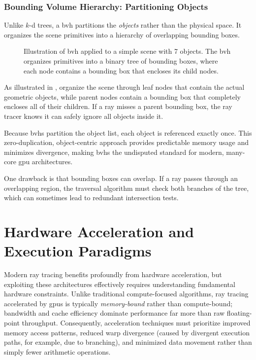 \subsubsection{Bounding Volume Hierarchy: Partitioning Objects}

Unlike $k$-d trees, a \gls{bvh} partitions the \emph{objects} rather than the physical space. It organizes the scene primitives into a hierarchy of overlapping bounding boxes.

\begin{figure}
  \caption{Illustration of \gls{bvh} applied to a simple scene with 7 objects. The \gls{bvh} organizes primitives into a binary tree of bounding boxes, where each node contains a bounding box that encloses its child nodes.}
\end{figure}

As illustrated in ,  organize the scene through leaf nodes that contain the actual geometric objects, while parent nodes contain a bounding box that completely encloses all of their children. If a ray misses a parent bounding box, the ray tracer knows it can safely ignore all objects inside it.

Because \glspl{bvh} partition the object list, each object is referenced exactly once. This zero-duplication, object-centric approach provides predictable memory usage and minimizes divergence, making \glspl{bvh} the undisputed standard for modern, many-core \gls{gpu} architectures.

One drawback is that bounding boxes can overlap. If a ray passes through an overlapping region, the traversal algorithm must check both branches of the tree, which can sometimes lead to redundant intersection tests.

\section{Hardware Acceleration and  Execution Paradigms}

Modern ray tracing benefits profoundly from hardware acceleration, but exploiting these architectures effectively requires understanding fundamental hardware constraints. Unlike traditional compute-focused algorithms, ray tracing accelerated by \glspl{gpu} is typically \emph{memory-bound} rather than compute-bound; bandwidth and cache efficiency dominate performance far more than raw floating-point throughput. Consequently, acceleration techniques must prioritize improved memory access patterns, reduced warp divergence (caused by divergent execution paths, for example, due to branching), and minimized data movement rather than simply fewer arithmetic operations.

